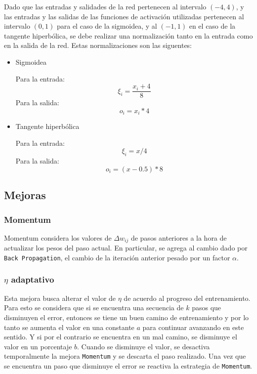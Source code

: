 \documentclass[a4paper,10pt]{article}
\begin{document}
        Dado que las entradas y salidades de la red pertenecen al intervalo $(-4, 4)$, y las entradas y las salidas de las funciones de activación utilizadas 
        pertenecen al intervalo $(0,1)$ para el caso de la sigmoidea, y al $(-1,1)$ en el caso de la tangente hiperbólica, se debe realizar una normalización 
        tanto en la entrada como en la salida de la red. Estas normalizaciones son las siguentes:

        \begin{itemize}
            \item Sigmoidea

                Para la entrada: \[ \xi_{i} = \frac{x_{i} + 4}{8} \]
                Para la salida: \[ o_{i} = x_{i} * 4 \]
            \item Tangente hiperbólica

                Para la entrada: \[ \xi_{i} = x / 4 \]
                Para la salida: \[ o_{i} = (x - 0.5) * 8 \]
        \end{itemize}

    \subsection{Mejoras}

        \subsubsection{Momentum}

        Momentum considera los valores de $\Delta w_{ij}$ de pasos anteriores a la hora de actualizar los pesos del paso actual.
        En particular, se agrega al cambio dado por \texttt{Back Propagation}, el cambio de la iteración anterior pesado por un factor $\alpha$.

        \subsubsection{$\eta$ adaptativo}

        Esta mejora busca alterar el valor de $\eta$ de acuerdo al progreso del entrenamiento.
        Para esto se considera que si se encuentra una secuencia de $k$ pasos que disminuyen el error, entonces se tiene un buen camino de entrenamiento y por lo tanto se aumenta 
        el valor en una constante $a$ para continuar avanzando en este sentido.
        Y si por el contrario se encuentra en un mal camino, se disminuye el valor en un porcentaje $b$.
        Cuando se disminuye el valor, se desactiva temporalmente la mejora \texttt{Momentum} y se descarta el paso realizado.
        Una vez que se encuentra un paso que disminuye el error se reactiva la
        estrategia de \texttt{Momentum}.
\end{document}
